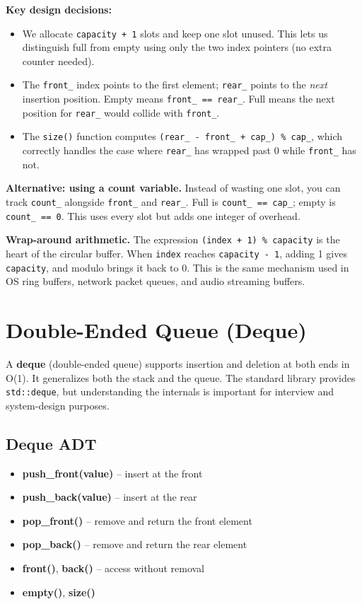 \textbf{Key design decisions:}
\begin{itemize}
\item We allocate \texttt{capacity + 1} slots and keep one slot unused. This lets us distinguish full from empty using only the two index pointers (no extra counter needed).
\item The \texttt{front\_} index points to the first element; \texttt{rear\_} points to the \emph{next} insertion position. Empty means \texttt{front\_ == rear\_}. Full means the next position for \texttt{rear\_} would collide with \texttt{front\_}.
\item The \texttt{size()} function computes \texttt{(rear\_ - front\_ + cap\_) \% cap\_}, which correctly handles the case where \texttt{rear\_} has wrapped past 0 while \texttt{front\_} has not.
\end{itemize}

\textbf{Alternative: using a count variable.} Instead of wasting one slot, you can track \texttt{count\_} alongside \texttt{front\_} and \texttt{rear\_}. Full is \texttt{count\_ == cap\_}; empty is \texttt{count\_ == 0}. This uses every slot but adds one integer of overhead.

\textbf{Wrap-around arithmetic.} The expression \texttt{(index + 1) \% capacity} is the heart of the circular buffer. When \texttt{index} reaches \texttt{capacity - 1}, adding 1 gives \texttt{capacity}, and modulo brings it back to 0. This is the same mechanism used in OS ring buffers, network packet queues, and audio streaming buffers.

\section{Double-Ended Queue (Deque)}

A \textbf{deque} (double-ended queue) supports insertion and deletion at both ends in O(1). It generalizes both the stack and the queue. The standard library provides \texttt{std::deque}, but understanding the internals is important for interview and system-design purposes.

\subsection{Deque ADT}

\begin{itemize}
\item \textbf{push\_front(value)} -- insert at the front
\item \textbf{push\_back(value)} -- insert at the rear
\item \textbf{pop\_front()} -- remove and return the front element
\item \textbf{pop\_back()} -- remove and return the rear element
\item \textbf{front()}, \textbf{back()} -- access without removal
\item \textbf{empty()}, \textbf{size()}
\end{itemize}

